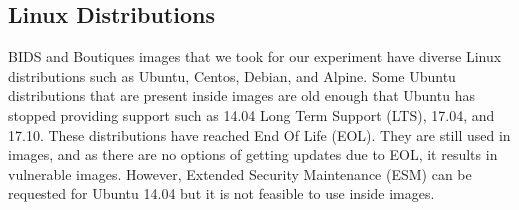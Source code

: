 \documentclass[a4paper,num-refs]{oup-contemporary}
\newcommand{\TG}[1]{\color{blue}From Tristan: #1\color{black}}
\begin{document}

\subsection{Linux Distributions}

BIDS and Boutiques images that we took for our experiment have diverse Linux
distributions such as Ubuntu, Centos, Debian, and Alpine.
Some Ubuntu distributions that are present inside images are old enough
that Ubuntu has stopped providing support such as 14.04 Long Term Support (LTS), 17.04, and 17.10. These
distributions have reached End Of Life (EOL). They are still used in images, and
as there are no options of getting updates due to EOL, it results in vulnerable images.
However, Extended Security Maintenance 
(ESM) can be requested for Ubuntu 14.04 but it is not feasible to use inside images. 
\end{document}
